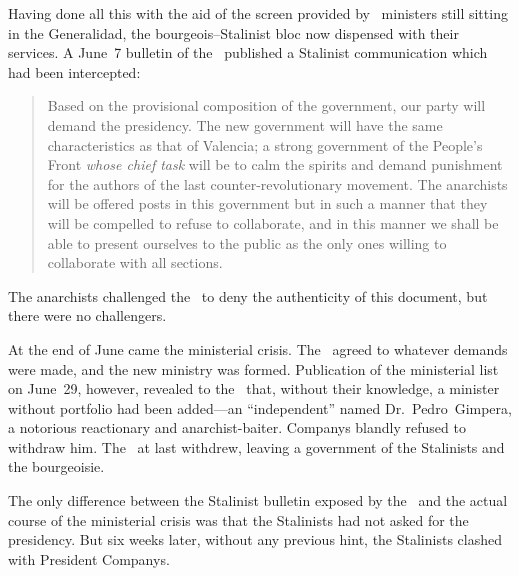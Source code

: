 Having done all this with the aid of the screen provided by \CNT\ ministers still sitting in the Generalidad, the bourgeois--Stalinist bloc now dispensed with their services.
A June~7 bulletin of the \FAI\ published a Stalinist communication which had been intercepted:\indexCNT

\begin{quotation}
  Based on the provisional composition of the government, our party will demand the presidency. The new government will have the same characteristics as that of Valencia; a strong government of the People’s Front \emph{whose chief task} will be to calm the spirits and demand punishment for the authors of the last counter-revolutionary movement. The anarchists will be offered posts in this government but in such a manner that they will be compelled to refuse to collaborate, and in this manner we shall be able to present ourselves to the public as the only ones willing to collaborate with all sections.
\end{quotation}

The anarchists challenged the \PSUC\ to deny the authenticity of this document, but there were no challengers.

At the end of June came the ministerial crisis. The \CNT\ agreed to whatever demands were made, and the new ministry was formed. Publication of the ministerial list on June~29, however, revealed to the \CNT\ that, without their knowledge, a minister without portfolio had been added---an ``independent'' named Dr.~Pedro~Gimpera, a notorious reactionary and anarchist-baiter. Companys blandly refused to withdraw him. The \CNT\ at last withdrew, leaving a government of the Stalinists and the bourgeoisie. {\indexCNT}

The only difference between the Stalinist bulletin exposed by the \FAI\ and the actual course of the ministerial crisis was that the Stalinists had not asked for the presidency. But six weeks later, without any previous hint, the Stalinists clashed with President Companys.

